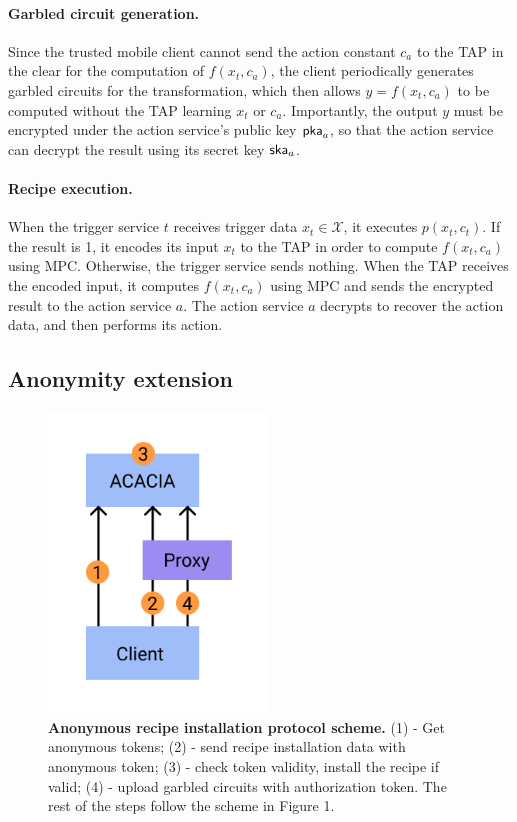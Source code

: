 \paragraph{Garbled circuit generation.}
Since the trusted mobile client cannot send the action constant $c_a$ to the TAP
in the clear for the computation of $f(x_t, c_a)$, the client periodically
generates garbled circuits for the transformation, which then allows $y = f(x_t,
c_a)$ to be computed without the TAP learning $x_t$ or $c_a$. Importantly, the
output $y$ must be encrypted under the action service's public key $\mathsf{pka}_a$, so
that the action service can decrypt the result using its secret key $\mathsf{ska}_a$.

\paragraph{Recipe execution.}
When the trigger service $t$ receives trigger data $x_t \in \mathcal{X}$, it
executes $p(x_t, c_t)$. If the result is 1, it encodes its input $x_t$ to the
TAP in order to compute $f(x_t, c_a)$ using MPC. Otherwise, the trigger service
sends nothing. When the TAP receives the encoded input, it computes $f(x_t,
c_a)$ using MPC and sends the encrypted result to the action service $a$. The
action service $a$ decrypts to recover the action data, and then performs its
action.

\subsection{Anonymity extension}

\begin{figure}
\includegraphics[height=8cm]{graphics/Proxy1.png}
\caption{\textbf{Anonymous recipe installation protocol scheme.} (1) - Get anonymous tokens; (2) - send
recipe installation data with anonymous token; (3) -  check token validity, install the recipe if valid; (4) -
upload garbled circuits with authorization token. The rest of the steps follow the scheme in Figure 1.}
\end{figure}

